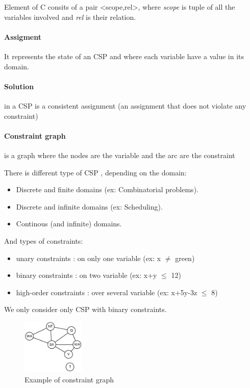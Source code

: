  Element of  C consits  of a pair  <scope,rel>, where  \textit{scope} is
 tuple of all the variables involved and \textit{rel} is their relation.

 \paragraph{Assigment} It represents the state  of an CSP and where each
variable have a value in its domain.

 \paragraph{Solution} in a CSP is a consistent assignment (an assignment
 that does not violate any constraint)

 \paragraph{Constraint  graph}  is  a  graph where  the  nodes  are  the
variable and the arc are the constraint

	There is different type of CSP , depending on the domain:
	\begin{itemize}
		\item Discrete and finite domains (ex: Combinatorial problems).
		\item Discrete and infinite domains (ex: Scheduling).
		\item Continous (and infinite) domains.
	\end{itemize}
	And types of constraints:
	\begin{itemize}
		\item unary constraints : on only one variable (ex: x $\neq$ green)
		\item binary constraints : on two variable (ex: x+y $\leq$ 12)
		\item high-order constraints : over several variable (ex: x+5y-3z $\leq$ 8)
	\end{itemize}
	We only consider only CSP with binary constraints.

    \begin{figure}
        \centering
        \includegraphics[width=3cm]{constraint.png}
        \caption{Example of constraint graph}
    \end{figure}

